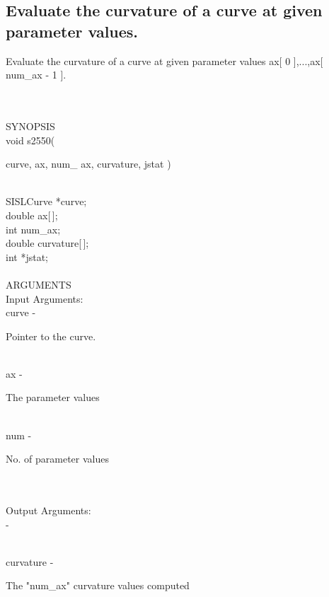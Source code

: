 \subsection{Evaluate the curvature of a curve at given parameter values.}
\begin{minipg1}
Evaluate the curvature of a curve at given parameter values
               ax[ 0 ],...,ax[ num\_ax - 1 ].
\end{minipg1} \\ \\
SYNOPSIS\\
        \> void s2550(\begin{minipg3}
             {\fov curve},  {\fov ax}, num\_ {\fov ax},  {\fov curvature}, jstat )
                \end{minipg3}\\
                \>\>    SISLCurve    \>  *{\fov curve};\\
                \>\>    double    \>  {\fov ax}[\,];\\
                \>\>    int    \>  {\fov num}\_ax;\\
                \>\>    double    \>  {\fov curvature}[\,];\\
                \>\>    int    \>  *{\fov jstat};\\
\\
ARGUMENTS\\
	\>Input Arguments:\\
        \>\>    {\fov curve}\> - \>  \begin{minipg2}
                     Pointer to the curve.
                               \end{minipg2}\\
        \>\>    {\fov ax}\> - \>  \begin{minipg2}
                     The parameter values
                               \end{minipg2}\\
        \>\>    {\fov num}\> - \>  \begin{minipg2}
                     No. of parameter values
                               \end{minipg2}\\
\\
	\>Output Arguments:\\
        \>\>    {\fov }\> - \>  \begin{minipg2}
             
                               \end{minipg2}\\
        \>\>    {\fov curvature}\> - \>  \begin{minipg2}
                     The "num\_ax" curvature values computed
                               \end{minipg2}\\

